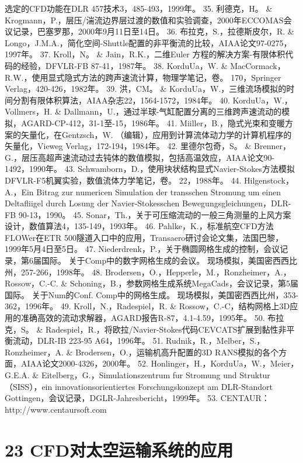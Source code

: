 \documentclass[UTF8,11pt,a4paper,openany,fontset=fandol]{ctexbook}
\begin{document}
选定的CFD功能在DLR 457技术3，485-493，1999年。 35. 利德克，H。 \& Krogmann，P.，层压/湍流边界层过渡的数值和实验调查，2000年ECCOMAS会议记录，巴塞罗那，2000年9月11日至14日。 36. 布拉克，S.，拉德斯皮尔，R. \& Longo，J.M.A.，简化空间-Shuttle配置的非平衡流的比较，AIAA论文97-0275，1997年。 37. Kroll，N。 \& Jain，R.K.，二维Euler 方程的解决方案-有限体积代码的经验，DFVLR-FB 87-41，1987年。 38. KorduUa，W. \& MacCormack，R.W.，使用显式隐式方法的跨声速流计算，物理学笔记，卷。 170，Springer Verlag，420-426，1982年。 39. 洪，CM。 \& KorduUa，W.，三维流场模拟的时间分割有限体积算法，AIAA杂志22，1564-1572，1984年。 40. KorduUa，W.，Vollmers，H. \& Dallmann，U.，通过半球-气缸配置分离的三维跨声速流动的模拟，AGARD-CP-412，31-1至-15，1986年。 41. Miiller，B.，隐式光束和变暖方案的矢量化，在Gentzsch，W. （编辑），应用到计算流体动力学的计算机程序的矢量化，Vieweg Verlag，172-194，1984年。 42. 里德尔包奇，S。 \& Brenner，G.，层压高超声速流动过去钝体的数值模拟，包括高温效应，AIAA论文90-1492，1990年。 43. Schwamborn，D.，使用块状结构显式Navier-Stokes方法模拟DFVLR-F5机翼实验，数值流体力学笔记，卷。 22，1988年。 44. Hilgenstock，A.，Ein Bitrag zur numericen Simulation der transschen Stromung um einen Deltafliigel durch Losung der Navier-Stokesschen Bewegungsgleichungen，DLR-FB 90-13，1990。 45. Sonar，Th.，关于可压缩流动的一般三角测量的上风方案设计，数值算法4，135-149，1993年。 46. Pahlke，K.，标准航空CFD方法FLOWer在ETR 500隧道入口中的应用，Transaero研讨会论文集，法国巴黎，1999年5月4日至5日。 47. Niederdrenk，P.，关于椭圆网格生成的控制，会议记录，第6届国际。 关于Comp中的数字网格生成的会议。 现场模拟，美国密西西比州，257-266，1998年。 48. Brodersen，O.，Hepperle，M.，Ronzheimer，A.，Rossow，C.-C. \& Schoning，B.，参数网格生成系统MegaCads，会议记录，第5届国际。 关于Num的Conf. Comp中的网格生成。 现场模拟，美国密西西比州，353-362，1996年。 49. Kroll，N.，Radespiel，R. \& Rossow，C.-C，结构网格上3D应用的准确高效的流动求解器，AGARD报告R-87，4.1-4.59，1995年。 50. 布拉克，S。 \& Radespiel，R.，将欧拉/Navier-Stokes代码CEVCATS扩展到黏性非平衡流动，DLR-IB 223-95 A64，1996年。 51. Rudnik，R.，Melber，S.，Ronzheimer，A. \& Brodersen，O.，运输机高升配置的3D RANS模拟的各个方面，AIAA论文2000-4326，2000年。 52. Honlinger，H.，KorduUa，W.，Meier，G.E.A. \& Eitelberg，G.，Simulationszentrum fur Stromung und Struktur（SISS），ein innovationsorientiertes Forschungskonzept am DLR-Standort Gottingen，会议记录，DGLR-Jahresbericht，1999年。 53. CENTAUR：http://www.centaursoft.com

\clearpage
\chapter{23 CFD对太空运输系统的应用}
\end{document}

